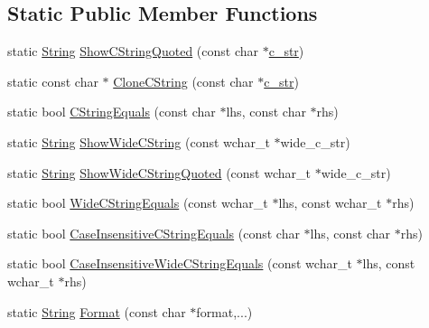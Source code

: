 \subsection*{\-Static \-Public \-Member \-Functions}
\begin{DoxyCompactItemize}
\item 
static \hyperlink{classtesting_1_1internal_1_1String}{\-String} \hyperlink{classtesting_1_1internal_1_1String_a682efb26ffa6dca7101971c318382d5c}{\-Show\-C\-String\-Quoted} (const char $\ast$\hyperlink{classtesting_1_1internal_1_1String_a89da6be964480b4c86334e4e337d3cf2}{c\-\_\-str})
\item 
static const char $\ast$ \hyperlink{classtesting_1_1internal_1_1String_a122ac37f647b23428fb20f527ed5e2b2}{\-Clone\-C\-String} (const char $\ast$\hyperlink{classtesting_1_1internal_1_1String_a89da6be964480b4c86334e4e337d3cf2}{c\-\_\-str})
\item 
static bool \hyperlink{classtesting_1_1internal_1_1String_ac1abc71678dbb1323757df95de3c5a46}{\-C\-String\-Equals} (const char $\ast$lhs, const char $\ast$rhs)
\item 
static \hyperlink{classtesting_1_1internal_1_1String}{\-String} \hyperlink{classtesting_1_1internal_1_1String_a350a83c2a7b5b7510072a0fd9f322471}{\-Show\-Wide\-C\-String} (const wchar\-\_\-t $\ast$wide\-\_\-c\-\_\-str)
\item 
static \hyperlink{classtesting_1_1internal_1_1String}{\-String} \hyperlink{classtesting_1_1internal_1_1String_a0e4af8864d2b052cd89e61c1dc21bfaa}{\-Show\-Wide\-C\-String\-Quoted} (const wchar\-\_\-t $\ast$wide\-\_\-c\-\_\-str)
\item 
static bool \hyperlink{classtesting_1_1internal_1_1String_a911db0cff27e6663b2ff74014c05de35}{\-Wide\-C\-String\-Equals} (const wchar\-\_\-t $\ast$lhs, const wchar\-\_\-t $\ast$rhs)
\item 
static bool \hyperlink{classtesting_1_1internal_1_1String_a74c3f7f7cf90cc53c995dde20883d922}{\-Case\-Insensitive\-C\-String\-Equals} (const char $\ast$lhs, const char $\ast$rhs)
\item 
static bool \hyperlink{classtesting_1_1internal_1_1String_a7d0738cc0251b4109b35d0c388f99603}{\-Case\-Insensitive\-Wide\-C\-String\-Equals} (const wchar\-\_\-t $\ast$lhs, const wchar\-\_\-t $\ast$rhs)
\item 
static \hyperlink{classtesting_1_1internal_1_1String}{\-String} \hyperlink{classtesting_1_1internal_1_1String_a8a1b50faf1d091441d626e123630b87a}{\-Format} (const char $\ast$format,...)
\item 

\end{DoxyCompactItemize}
